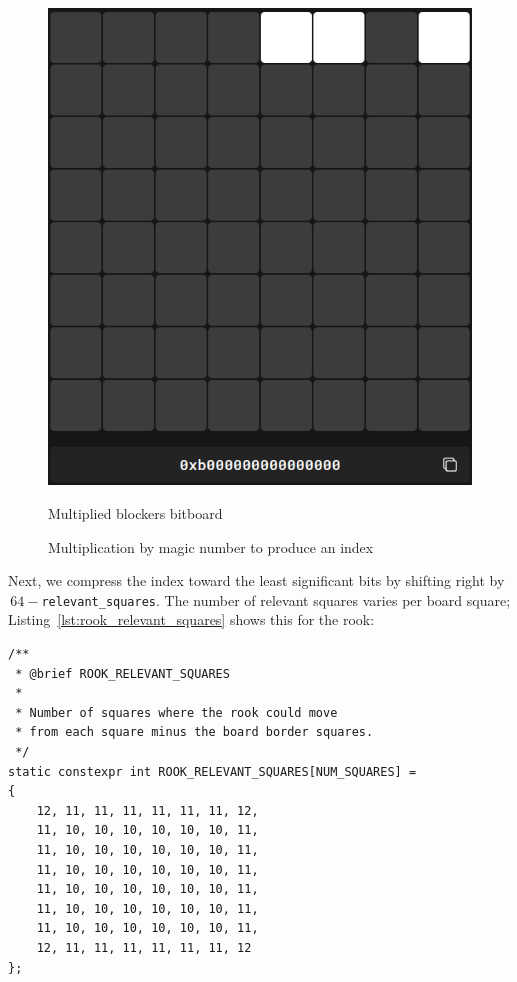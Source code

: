\begin{figure}[H]
\begin{minipage}[c]{0.4\textwidth}
        \includegraphics[width=\textwidth]{Imagenes/magics_multiplied_blockers.png}
        \caption*{Multiplied blockers bitboard}
    \end{minipage}
    \caption{Multiplication by magic number to produce an index}
    \label{fig:magic_multiplication}
\end{figure}

\noindent Next, we compress the index toward the least significant bits by shifting right by \(\,64-\)\texttt{relevant\_squares}. The number of relevant squares varies per board square; Listing~\ref{lst:rook_relevant_squares} shows this for the rook:

\begin{lstlisting}[breaklines=true, frame=single, caption={Number of relevant squares for each rook square}, label={lst:rook_relevant_squares}]
/**
 * @brief ROOK_RELEVANT_SQUARES
 * 
 * Number of squares where the rook could move
 * from each square minus the board border squares.
 */
static constexpr int ROOK_RELEVANT_SQUARES[NUM_SQUARES] =
{
    12, 11, 11, 11, 11, 11, 11, 12,
    11, 10, 10, 10, 10, 10, 10, 11,
    11, 10, 10, 10, 10, 10, 10, 11,
    11, 10, 10, 10, 10, 10, 10, 11,
    11, 10, 10, 10, 10, 10, 10, 11,
    11, 10, 10, 10, 10, 10, 10, 11,
    11, 10, 10, 10, 10, 10, 10, 11,
    12, 11, 11, 11, 11, 11, 11, 12
};
\end{lstlisting}

